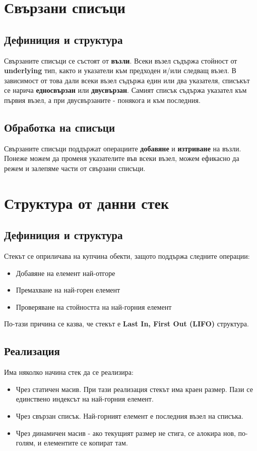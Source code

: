 \documentclass[fleqn,12pt]{article}
\begin{document}
\section{Свързани списъци}
\subsection{Дефиниция и структура}
Свързаните списъци се състоят от \textbf{възли}. Всеки възел съдържа стойност от \textbf{underlying} тип, както 
и указатели към предходен и/или следващ възел. В зависимост от това дали всеки възел съдържа един или два указателя,
списъкът се нарича \textbf{едносвързан} или \textbf{двусвързан}. Самият списък съдържа указател към първия възел, 
а при двусвързаните - понякога и към последния.

\subsection{Обработка на списъци}
Свързаните списъци поддържат операциите \textbf{добавяне} и \textbf{изтриване} на възли.
Понеже можем да променя указателите във всеки възел, можем ефикасно да режем и залепяме части от свързани списъци. 

\section{Структура от данни стек}
\subsection{Дефиниция и структура}
Стекът се оприличава на купчина обекти, защото поддържа следните операции:
\begin{itemize}
    \item Добавяне на елемент най-отгоре
    \item Премахване на най-горен елемент
    \item Проверяване на стойността на най-горния елемент
\end{itemize}

По-тази причина се казва, че стекът е \textbf{Last In, First Out (LIFO)} структура.

\subsection{Реализация}
Има няколко начина стек да се реализира:
\begin{itemize}
    \item Чрез статичен масив. При тази реализация стекът има краен размер. Пази се единствено индексът на най-горния елемент. 
    \item Чрез свързан списък. Най-горният елемент е последния възел на списъка.
    \item Чрез динамичен масив - ако текущият размер не стига, се алокира нов, по-голям, и елементите се копират там.
\end{itemize}
\end{document}
